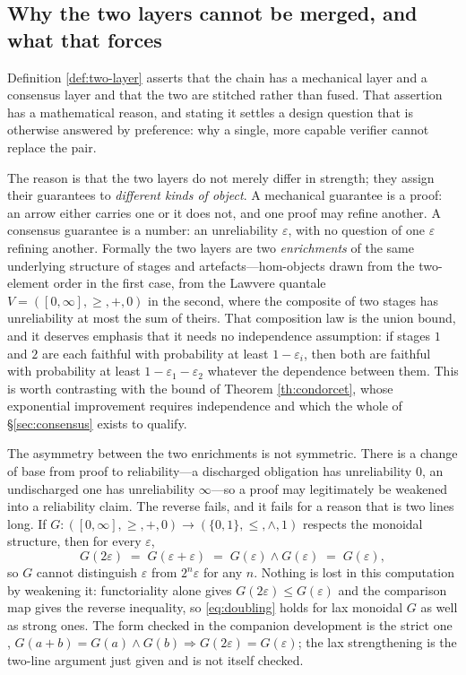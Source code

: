 \subsection{Why the two layers cannot be merged, and what that forces}\label{sec:enrichment}

Definition \ref{def:two-layer} asserts that the chain has a mechanical layer and a consensus layer
and that the two are stitched rather than fused. That assertion has a mathematical reason, and
stating it settles a design question that is otherwise answered by preference: why a single, more
capable verifier cannot replace the pair.

The reason is that the two layers do not merely differ in strength; they assign their guarantees to
\emph{different kinds of object}. A mechanical guarantee is a proof: an arrow either carries one or
it does not, and one proof may refine another. A consensus guarantee is a number: an unreliability
$\varepsilon$, with no question of one $\varepsilon$ refining another. Formally the two layers are
two \emph{enrichments} of the same underlying structure of stages and artefacts---hom-objects drawn
from the two-element order in the first case, from the Lawvere quantale
$V = ([0,\infty],\geq,+,0)$ in the second, where the composite of two stages has unreliability at
most the sum of theirs. That composition law is the union bound, and it deserves emphasis that it
needs no independence assumption: if stages $1$ and $2$ are each faithful with probability at least
$1-\varepsilon_i$, then both are faithful with probability at least $1-\varepsilon_1-\varepsilon_2$
whatever the dependence between them. This is worth contrasting with the bound of
Theorem \ref{th:condorcet}, whose exponential improvement requires independence and which the whole
of \S\ref{sec:consensus} exists to qualify.

The asymmetry between the two enrichments is not symmetric. There is a change of base from proof to
reliability---a discharged obligation has unreliability $0$, an undischarged one has
unreliability $\infty$---so a proof may legitimately be weakened into a reliability claim. The
reverse fails, and it fails for a reason that is two lines long. If
$G : ([0,\infty],\geq,+,0) \to (\{0,1\},\leq,\wedge,1)$ respects the monoidal structure, then for
every $\varepsilon$,
\begin{equation}\label{eq:doubling}
G(2\varepsilon) \;=\; G(\varepsilon+\varepsilon) \;=\; G(\varepsilon)\wedge G(\varepsilon)
\;=\; G(\varepsilon),
\end{equation}
so $G$ cannot distinguish $\varepsilon$ from $2^n\varepsilon$ for any $n$. Nothing is lost in this
computation by weakening it: functoriality alone gives $G(2\varepsilon) \leq G(\varepsilon)$ and the
comparison map gives the reverse inequality, so \eqref{eq:doubling} holds for lax monoidal $G$ as
well as strong ones. The form checked in the companion development is the strict one \cite{assaylean},
$G(a+b) = G(a)\wedge G(b) \Rightarrow G(2\varepsilon) = G(\varepsilon)$; the lax strengthening is the
two-line argument just given and is not itself checked.

